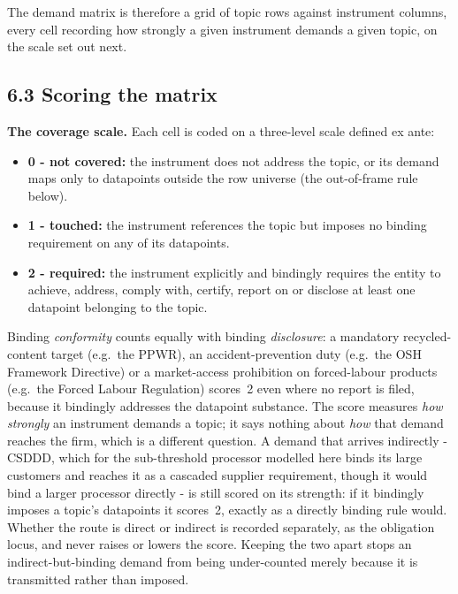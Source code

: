 The demand matrix is therefore a grid of topic rows against instrument columns,
every cell recording how strongly a given instrument demands a given topic, on the
scale set out next.

\FloatBarrier
\subsection{6.3 Scoring the matrix}\label{cm-matrix}

\textbf{The coverage scale.} Each cell is coded on a three-level scale defined ex
ante:
\begin{itemize}
\item \textbf{0 - not covered:} the instrument does not address the topic, or its
demand maps only to datapoints outside the row universe (the out-of-frame rule
below).
\item \textbf{1 - touched:} the instrument references the topic but imposes no
binding requirement on any of its datapoints.
\item \textbf{2 - required:} the instrument explicitly and bindingly requires
the entity to achieve, address, comply with, certify, report on or disclose at
least one datapoint belonging to the topic.
\end{itemize}
Binding \emph{conformity} counts equally with binding \emph{disclosure}: a
mandatory recycled-content target (e.g.\ the PPWR), an accident-prevention duty
(e.g.\ the OSH Framework Directive) or a market-access prohibition on
forced-labour products (e.g.\ the Forced Labour Regulation) scores~2 even where
no report is filed, because it bindingly addresses the datapoint substance. The score
measures \emph{how strongly} an instrument demands a topic; it says nothing about
\emph{how} that demand reaches the firm, which is a different question. A demand that
arrives indirectly - CSDDD, which for the sub-threshold processor modelled here
binds its large customers and reaches it as a cascaded supplier requirement,
though it would bind a larger processor directly - is still scored on its
strength: if
it bindingly imposes a topic's datapoints it scores~2, exactly as a directly binding
rule would. Whether the route is direct or indirect is recorded separately, as the
obligation locus, and never raises or lowers the score. Keeping the two apart stops
an indirect-but-binding demand from being under-counted merely because it is
transmitted rather than imposed.

